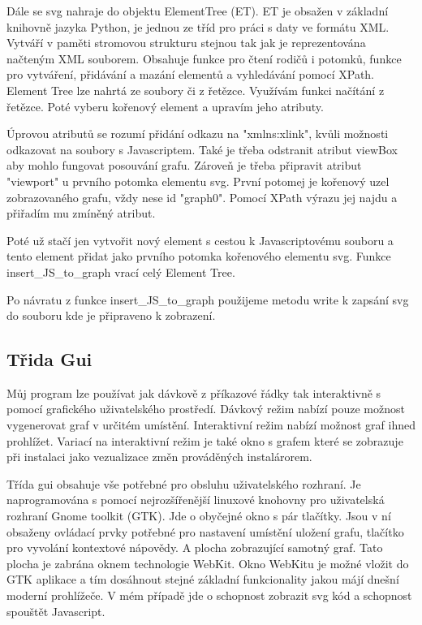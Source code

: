 \documentclass[color,table,oneside,nolot,nolof]{fithesis}
\begin{document}
	Dále se svg nahraje do objektu ElementTree (ET). ET je obsažen v základní knihovně jazyka Python, je jednou ze tříd pro práci s daty ve formátu XML. Vytváří v paměti stromovou
	strukturu stejnou tak jak je reprezentována načteným XML souborem. Obsahuje funkce pro čtení rodičů i potomků, funkce pro vytváření, přidávání a mazání elementů a vyhledávání pomocí 
	XPath. Element Tree lze nahrtá ze soubory či z řetězce. Využívám funkci načítání z řetězce. Poté vyberu kořenový element a upravím jeho atributy.

	Úprovou atributů se rozumí přidání odkazu na "xmlns:xlink", kvůli možnosti odkazovat na soubory s Javascriptem. Také je třeba odstranit atribut viewBox aby mohlo fungovat posouvání
	grafu. Zároveň je třeba připravit atribut "viewport" u prvního potomka elementu svg. První potomej je kořenový uzel zobrazovaného grafu, vždy nese id "graph0". Pomocí XPath výrazu jej
	najdu a přiřadím mu zmíněný atribut.

	Poté už stačí jen vytvořit nový element s cestou k Javascriptovému souboru a tento element přidat jako prvního potomka kořenového elementu svg. Funkce insert\_JS\_to\_graph vrací celý
	Element Tree.

	Po návratu z funkce insert\_JS\_to\_graph použijeme metodu write k zapsání svg do souboru kde je připraveno k zobrazení.

\subsection{Třida Gui}
	Můj program lze používat jak dávkově z příkazové řádky tak interaktivně s pomocí grafického uživatelského prostředí. Dávkový režim nabízí pouze možnost vygenerovat graf v určitém 
	umístění. Interaktivní režim nabízí možnost graf ihned prohlížet. Variací na interaktivní režim je také okno s grafem které se zobrazuje při instalaci jako vezualizace změn prováděných
	instalárorem. 

	Třída gui obsahuje vše potřebné pro obsluhu uživatelského rozhraní. Je naprogramována s pomocí nejrozšířenější linuxové knohovny pro uživatelská rozhraní Gnome toolkit (GTK). Jde o 
	obyčejné okno s pár tlačítky. Jsou v ní obsaženy ovládací prvky potřebné pro nastavení umístění uložení grafu, tlačítko pro vyvolání kontextové
	nápovědy. A plocha zobrazující samotný graf. Tato plocha je zabrána oknem technologie WebKit. Okno WebKitu je možné vložit do GTK aplikace a tím dosáhnout stejné základní funkcionality
	jakou májí dnešní moderní prohlížeče. V mém případě jde o schopnost zobrazit svg kód a schopnost spouštět Javascript.
\end{document}
